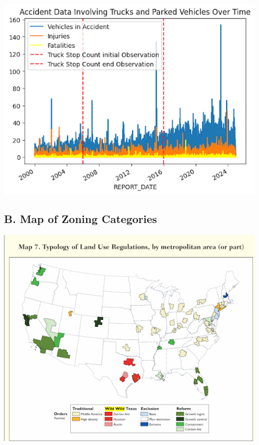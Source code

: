 \documentclass[
  12pt]{article}
\begin{document}
\includegraphics{images/unnamed.png}

\hypertarget{sec-b.-map-of-zoning-categories}{%
\subsection{B. Map of Zoning
Categories}\label{sec-b.-map-of-zoning-categories}}

\includegraphics{images/unnamed (1).png}


  
\end{document}
